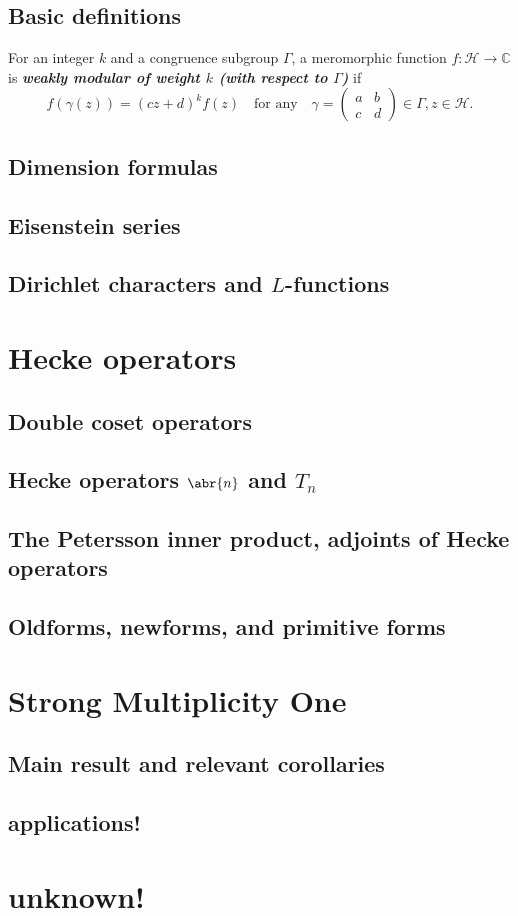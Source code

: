 \documentclass[10pt,leqno]{article}
\newcommand{\textib}[1]{\textbf{\textit{#1}}}
\begin{document}
\subsection{Basic definitions}
For an integer $k$ and a congruence subgroup $\varGamma$, a meromorphic function $f\colon \mathcal H\to \mathbb{C}$ is \textib{weakly modular of weight $k$ (with respect to $\varGamma$)} if \[f(\gamma(z)) = (cz+d)^kf(z)\quad\text{for any}\quad \gamma = \begin{pmatrix}
    a & b \\ c & d
\end{pmatrix}\in \varGamma, z\in \mathcal H.\]
\subsection{Dimension formulas}
\subsection{Eisenstein series}
\subsection{Dirichlet characters and $L$-functions}

\newpage\section{Hecke operators}
\subsection{Double coset operators}
\subsection{Hecke operators $\abr{n}$ and $T_n$}
\subsection{The Petersson inner product, adjoints of Hecke operators}
\subsection{Oldforms, newforms, and primitive forms}

\newpage\section{Strong Multiplicity One}
\subsection{Main result and relevant corollaries}
\subsection{applications!}

\newpage\section{unknown!}
\end{document}
